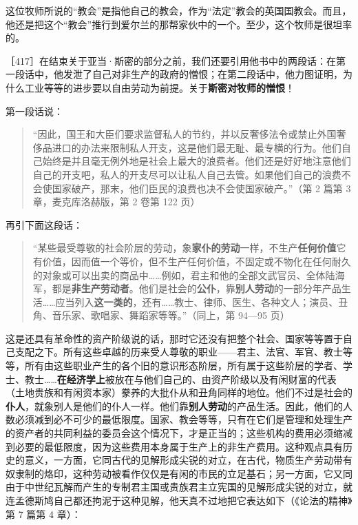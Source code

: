 这位牧师所说的“教会”是指他自己的教会，作为“法定”教会的英国国教会。而且，他还是把这个“教会”推行到爱尔兰的那帮家伙中的一个。至少，这个牧师是很坦率的。


［417］在结束关于亚当·斯密的部分之前，我们还要引用他书中的两段话：在第一段话中，他发泄了自己对非生产的政府的憎恨；在第二段话中，他力图证明，为什么工业等等的进步要以自由劳动为前提。关于\textbf{斯密对牧师的憎恨}！

第一段话说：

\begin{quote}“因此，国王和大臣们要求监督私人的节约，并以反奢侈法令或禁止外国奢侈品进口的办法来限制私人开支，这是他们最无耻、最专横的行为。他们自己始终是并且毫无例外地是社会上最大的浪费者。他们还是好好地注意他们自己的开支吧，私人的开支尽可以让私人自己去管。如果他们自己的浪费不会使国家破产，那末，他们臣民的浪费也决不会使国家破产。”（第 2 篇第 3 章，麦克库洛赫版，第 2 卷第 122 页）\end{quote}

再引下面这段话：

\begin{quote}“某些最受尊敬的社会阶层的劳动，象\textbf{家仆的劳动}一样，不生产\textbf{任何价值}\fontbox{~\{}它有价值，因而值一个等价，但不生产任何价值\fontbox{\}~}，不固定或不物化在任何耐久的对象或可以出卖的商品中……例如，君主和他的全部文武官员、全体陆海军，都是\textbf{非生产劳动者}。他们是社会的\textbf{公仆}，靠\textbf{别人劳动}的一部分年产品生活……应当列入\textbf{这一类的}，还有……教士、律师、医生、各种文人；演员、丑角、音乐家、歌唱家、舞蹈家等等。”（同上，第 94—95 页）\end{quote}

这是还具有革命性的资产阶级说的话，那时它还没有把整个社会、国家等等置于自己支配之下。所有这些卓越的历来受人尊敬的职业——君主、法官、军官、教士等等，所有由这些职业产生的各个旧的意识形态阶层，所有属于这些阶层的学者、学士、教士……\textbf{在经济学上}被放在与他们自己的、由资产阶级以及有闲财富的代表（土地贵族和有闲资本家）豢养的大批仆从和丑角同样的地位。他们不过是社会的\textbf{仆人}，就象别人是他们的仆人一样。他们靠\textbf{别人劳动}的产品生活。因此，他们的人数必须减到必不可少的最低限度。国家、教会等等，只有在它们是管理和处理生产的资产者的共同利益的委员会这个情况下，才是正当的；这些机构的费用必须缩减到必要的最低限度，因为这些费用本身属于生产上的非生产费用。这种观点具有历史的意义，一方面，它同古代的见解形成尖锐的对立，在古代，物质生产劳动带有奴隶制的烙印，这种劳动被看作仅仅是有闲的市民的立足基石；另一方面，它又同由于中世纪瓦解而产生的专制君主国或贵族君主立宪国的见解形成尖锐的对立，就连孟德斯鸠自己都还拘泥于这种见解，他天真不过地把它表达如下（《论法的精神》第 7 篇第 4 章）：

